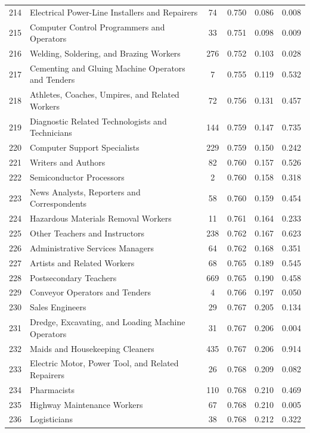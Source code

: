 {\begin{longtable}{llcccc}
 214 & Electrical Power-Line Installers and Repairers & 74 & 0.750 & 0.086 & 0.008 \\
 215 & Computer Control Programmers and Operators & 33 & 0.751 & 0.098 & 0.009 \\
 216 & Welding, Soldering, and Brazing Workers & 276 & 0.752 & 0.103 & 0.028 \\
 217 & Cementing and Gluing Machine Operators and Tenders & 7 & 0.755 & 0.119 & 0.532 \\
 218 & Athletes, Coaches, Umpires, and Related Workers & 72 & 0.756 & 0.131 & 0.457 \\
 219 & Diagnostic Related Technologists and Technicians & 144 & 0.759 & 0.147 & 0.735 \\
 220 & Computer Support Specialists & 229 & 0.759 & 0.150 & 0.242 \\
 221 & Writers and Authors & 82 & 0.760 & 0.157 & 0.526 \\
 222 & Semiconductor Processors & 2 & 0.760 & 0.158 & 0.318 \\
 223 & News Analysts, Reporters and Correspondents & 58 & 0.760 & 0.159 & 0.454 \\
 224 & Hazardous Materials Removal Workers & 11 & 0.761 & 0.164 & 0.233 \\
 225 & Other Teachers and Instructors & 238 & 0.762 & 0.167 & 0.623 \\
 226 & Administrative Services Managers & 64 & 0.762 & 0.168 & 0.351 \\
 227 & Artists and Related Workers & 68 & 0.765 & 0.189 & 0.545 \\
 228 & Postsecondary Teachers & 669 & 0.765 & 0.190 & 0.458 \\
 229 & Conveyor Operators and Tenders & 4 & 0.766 & 0.197 & 0.050 \\
 230 & Sales Engineers & 29 & 0.767 & 0.205 & 0.134 \\
 231 & Dredge, Excavating, and Loading Machine Operators & 31 & 0.767 & 0.206 & 0.004 \\
 232 & Maids and Housekeeping Cleaners & 435 & 0.767 & 0.206 & 0.914 \\
 233 & Electric Motor, Power Tool, and Related Repairers & 26 & 0.768 & 0.209 & 0.082 \\
 234 & Pharmacists & 110 & 0.768 & 0.210 & 0.469 \\
 235 & Highway Maintenance Workers & 67 & 0.768 & 0.210 & 0.005 \\
 236 & Logisticians & 38 & 0.768 & 0.212 & 0.322 \\

\end{longtable}}
